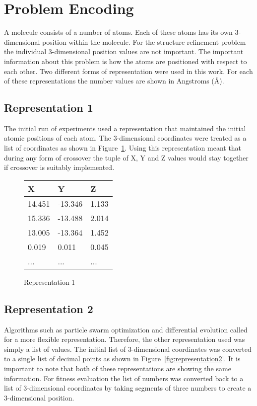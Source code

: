 \section{Problem Encoding}
\label{sec:problem-encoding}

A molecule consists of a number of atoms. Each of these atoms has its own 3-dimensional position within the molecule. For the structure refinement problem the individual 3-dimensional position values are not important. The important information about this problem is how the atoms are positioned with respect to each other. Two different forms of representation were used in this work. For each of these representations the number values are shown in Angstroms (\AA).

\subsection{Representation 1}
\label{subsec:encoding-1}

The initial run of experiments used a representation that maintained the initial atomic positions of each atom. The 3-dimensional coordinates were treated as a list of coordinates as shown in Figure~\ref{fig:representation1}. Using this representation meant that during any form of crossover the tuple of X, Y and Z values would stay together if crossover is suitably implemented.

\begin{figure}
	\centering
	\begin{tabular}{ | l | l | l | }
		\hline
		X & Y & Z \\ \hline
		14.451 & -13.346 & 1.133 \\ \hline
		15.336 & -13.488 & 2.014 \\ \hline
		13.005 & -13.364 & 1.452 \\ \hline
		0.019 & 0.011 & 0.045 \\ \hline
		... & ... & ... \\ \hline
	\end{tabular}
	\caption{Representation 1}
	\label{fig:representation1}
\end{figure}

\subsection{Representation 2}
\label{subsec:encoding-2}

Algorithms such as particle swarm optimization and differential evolution called for a more flexible representation. Therefore, the other representation used was simply a list of values. The initial list of 3-dimensional coordinates was converted to a single list of decimal points as shown in Figure~\ref{fig:representation2}. It is important to note that both of these representations are showing the same information. For fitness evaluation the list of numbers was converted back to a list of 3-dimensional coordinates by taking segments of three numbers to create a 3-dimensional position.

